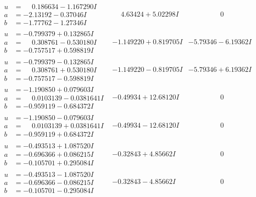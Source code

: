 \documentclass[1p]{elsarticle_modified}
\theoremstyle{definition}
\begin{document}
$$\begin{array}{c|c|c}
\begin{aligned}
u &= \phantom{-}0.186634 - 1.167290 I \\
a &= -2.13192 - 0.37046 I \\
b &= -1.77762 - 1.27346 I\end{aligned}
 & \phantom{-}4.63424 + 5.02298 I & \phantom{-0.000000 } 0 \\ \hline\begin{aligned}
u &= -0.799379 + 0.132865 I \\
a &= \phantom{-}0.308761 - 0.530180 I \\
b &= -0.757517 + 0.598819 I\end{aligned}
 & -1.149220 + 0.819705 I & -5.79346 - 6.19362 I \\ \hline\begin{aligned}
u &= -0.799379 - 0.132865 I \\
a &= \phantom{-}0.308761 + 0.530180 I \\
b &= -0.757517 - 0.598819 I\end{aligned}
 & -1.149220 - 0.819705 I & -5.79346 + 6.19362 I \\ \hline\begin{aligned}
u &= -1.190850 + 0.079603 I \\
a &= \phantom{-}0.0103139 - 0.0381641 I \\
b &= -0.959119 - 0.684372 I\end{aligned}
 & -0.49934 + 12.68120 I & \phantom{-0.000000 } 0 \\ \hline\begin{aligned}
u &= -1.190850 - 0.079603 I \\
a &= \phantom{-}0.0103139 + 0.0381641 I \\
b &= -0.959119 + 0.684372 I\end{aligned}
 & -0.49934 - 12.68120 I & \phantom{-0.000000 } 0 \\ \hline\begin{aligned}
u &= -0.493513 + 1.087520 I \\
a &= -0.696366 + 0.086215 I \\
b &= -0.105701 + 0.295084 I\end{aligned}
 & -0.32843 + 4.85662 I & \phantom{-0.000000 } 0 \\ \hline\begin{aligned}
u &= -0.493513 - 1.087520 I \\
a &= -0.696366 - 0.086215 I \\
b &= -0.105701 - 0.295084 I\end{aligned}
 & -0.32843 - 4.85662 I & \phantom{-0.000000 } 0 \\ \hline\begin{aligned}

\end{aligned}
\end{array}$$
\end{document}
